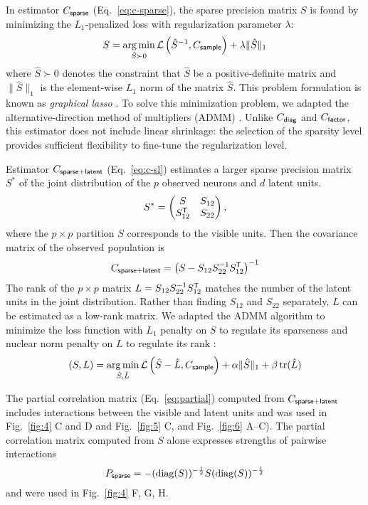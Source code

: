 In estimator $C_{\sf sparse}$ (Eq.~\ref{eq:c-sparse}), the sparse precision matrix $S$ is found by minimizing the $L_1$-penalized loss with regularization parameter $\lambda$:
\begin{equation}
S = \operatorname*{arg\,min}\limits_{\hat S \succ 0} \mathcal L\left({\hat S}^{-1},C_{\sf sample}\right) + \lambda \|\hat S \|_1
\end{equation}
where $\hat S\succ 0$ denotes the constraint that $\hat S$ be a positive-definite matrix and $\|\hat S\|_1$ is the element-wise $L_1$ norm of the matrix $\hat S$. This problem formulation is known as \emph{graphical lasso} \cite{Meinshausen:2006, Friedman:2008}. To solve this minimization problem, we adapted the alternative-direction method of multipliers (ADMM) \cite{Ma:2013}.
Unlike $C_{\sf diag}$ and $C_{\sf factor}$, this estimator does not include linear shrinkage: the selection of the sparsity level provides sufficient flexibility to fine-tune the regularization level.

Estimator $C_{\sf sparse+latent}$ (Eq.~\ref{eq:c-sl}) estimates a larger sparse precision matrix $S^\ast$ of the joint distribution of the $p$ observed neurons and $d$ latent units.
\begin{equation}
S^\ast=
\begin{pmatrix}
S & S_{12} \\
S_{12}^{\sf T} & S_{22}
\end{pmatrix},
\end{equation}
where the $p\times p$ partition $S$ corresponds to the visible units.
Then the covariance matrix of the observed population is
\begin{equation}
C_{\sf sparse+latent} = \left(S-S_{12}S_{22}^{-1}S_{12}^{\sf T}\right)^{-1}
\end{equation}
The rank of the $p\times p$  matrix $L=S_{12}S_{22}^{-1}S_{12}^{\sf T}$ matches the number of the latent units in the joint distribution. Rather than finding $S_{12}$ and $S_{22}$ separately, $L$ can be estimated as a low-rank matrix. We adapted the ADMM algorithm to minimize the loss function with $L_1$ penalty on $S$ to regulate its sparseness and nuclear norm penalty on $L$ to regulate its rank \cite{Chandrasekaran:2010,Ma:2013}:
\begin{equation}\label{eq:ma}
(S,L) = \operatorname*{arg\,min}\limits_{\hat S,\hat L} \mathcal L\left(\hat S-\hat L, C_{\sf sample}\right) + \alpha\|\hat S\|_1 + \beta\operatorname{tr}(\hat L)
\end{equation}

The partial correlation matrix (Eq.~\ref{eq:partial}) computed from $C_{\sf sparse+latent}$ includes interactions between the visible and latent units and was used in Fig.~\ref{fig:4} C and D and Fig.~\ref{fig:5} C, and Fig.~\ref{fig:6} A--C).  The partial correlation matrix computed from $S$ alone expresses strengths of pairwise interactions
\begin{equation}
P_{\sf sparse} = -(\mbox{diag}(S))^{-\frac 1 2} S  (\mbox{diag}(S))^{-\frac 1 2}
\end{equation}
and were used in Fig.~\ref{fig:4} F, G, H.

